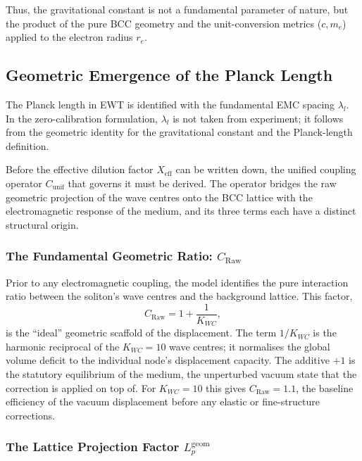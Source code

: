 \documentclass[10pt,a4paper]{article}
\begin{document}
Thus, the gravitational constant is not a fundamental parameter of nature, but the product of the pure BCC geometry and the unit-conversion metrics (\(c, m_e\)) applied to the electron radius \(r_e\).

\subsection{Geometric Emergence of the Planck Length}
\label{sec:lambda_l_geom}

The Planck length in EWT is identified with the fundamental EMC spacing \(\lambda_l\). In the zero-calibration formulation, \(\lambda_l\) is not taken from experiment; it follows from the geometric identity for the gravitational constant and the Planck-length definition.

Before the effective dilution factor \(X_{\text{eff}}\) can be written down, the unified coupling operator \(C_{\text{unif}}\) that governs it must be derived. The operator bridges the raw geometric projection of the wave centres onto the BCC lattice with the electromagnetic response of the medium, and its three terms each have a distinct structural origin.

\subsubsection*{The Fundamental Geometric Ratio: \(C_{\text{Raw}}\)}

Prior to any electromagnetic coupling, the model identifies the pure interaction ratio between the soliton's wave centres and the background lattice. This factor,
\begin{equation}
	C_{\text{Raw}} = 1 + \frac{1}{K_{WC}},
	\label{eq:C_raw}
\end{equation}
is the ``ideal'' geometric scaffold of the displacement. The term \(1/K_{WC}\) is the harmonic reciprocal of the \(K_{WC}=10\) wave centres; it normalises the global volume deficit to the individual node's displacement capacity. The additive \(+1\) is the statutory equilibrium of the medium, the unperturbed vacuum state that the correction is applied on top of. For \(K_{WC}=10\) this gives \(C_{\text{Raw}} = 1.1\), the baseline efficiency of the vacuum displacement before any elastic or fine-structure corrections.

\subsubsection*{The Lattice Projection Factor \(L_p^{\text{geom}}\)}
\end{document}
